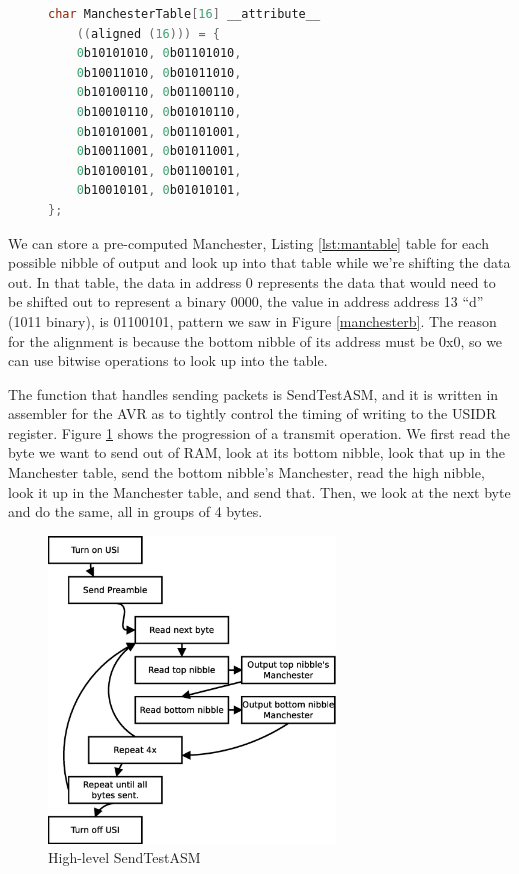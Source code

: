 \documentclass[13pt]{ltxdoc}
\begin{document}
\begin{figure}
\begin{lstlisting}[caption=Manchester Lookup Table\label{lst:mantable},language=C, frame=single]
char ManchesterTable[16] __attribute__
	((aligned (16))) = {
	0b10101010, 0b01101010,
	0b10011010, 0b01011010,
	0b10100110, 0b01100110,
	0b10010110, 0b01010110,
	0b10101001, 0b01101001,
	0b10011001, 0b01011001,
	0b10100101, 0b01100101,
	0b10010101, 0b01010101,
};
\end{lstlisting}
\end{figure}

We can store a pre-computed Manchester, Listing \ref{lst:mantable} table for each possible nibble of output
and look up into that table while we're shifting the data out.  In that table, the data in address
0 represents the data that would need to be shifted out to represent a binary 0000, the value in address
address 13 ``d'' (1011 binary), is 01100101, pattern we saw in Figure \ref{manchesterb}.  The reason for the alignment
is because the bottom nibble of its address must be 0x0, so we can use bitwise operations to look up
into the table.

The function that handles sending packets is SendTestASM, and it is written in assembler for the AVR as
to tightly control the timing of writing to the USIDR register.  Figure \ref{sendexplain} shows the progression
of a transmit operation. We first
read the byte we want to send out of RAM, look at its bottom nibble, look that up in the Manchester
table, send the bottom nibble's  Manchester, read the high nibble, look it up in the Manchester table, and
send that.  Then, we look at the next byte and do the same, all in groups of 4 bytes.

\begin{figure}
    \centering
    \includegraphics[width=3.0in]{sendexplain}
    \caption{High-level SendTestASM}
    \label{sendexplain}
\end{figure}
\end{document}

